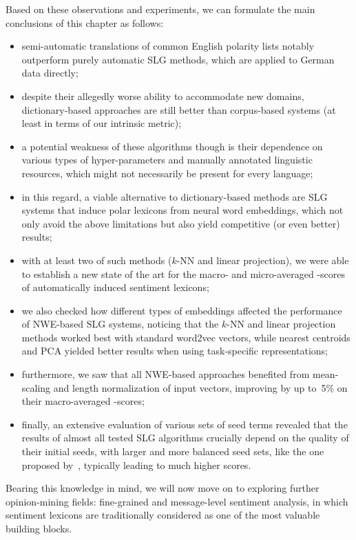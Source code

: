 Based on these observations and experiments, we can formulate the main
conclusions of this chapter as follows:
\begin{itemize}
\item semi-automatic translations of common English polarity lists
  notably outperform purely automatic SLG methods, which are applied
  to German data directly;
\item despite their allegedly worse ability to accommodate new
  domains, dictionary-based approaches are still better than
  corpus-based systems (at least in terms of our intrinsic metric);
\item a potential weakness of these algorithms though is their
  dependence on various types of hyper-parameters and manually
  annotated linguistic resources, which might not necessarily be
  present for every language;
\item in this regard, a viable alternative to dictionary-based methods
  are SLG systems that induce polar lexicons from neural word
  embeddings, which not only avoid the above limitations but also
  yield competitive (or even better) results;
\item with at least two of such methods ($k$-NN and linear
  projection), we were able to establish a new state of the art for
  the macro- and micro-averaged \F-scores of automatically induced
  sentiment lexicons;
\item we also checked how different types of embeddings affected the
  performance of NWE-based SLG systems, noticing that the $k$-NN and
  linear projection methods worked best with standard word2vec
  vectors, while nearest centroids and PCA yielded better results when
  using task-specific representations;
\item furthermore, we saw that all NWE-based approaches benefited from
  mean-scaling and length normalization of input vectors, improving by
  up to~5\% on their macro-averaged \F-scores;
\item finally, an extensive evaluation of various sets of seed terms
  revealed that the results of almost all tested SLG algorithms
  crucially depend on the quality of their initial seeds, with larger
  and more balanced seed sets, \eg{} like the one proposed
  by~\citet{Kim:04}, typically leading to much higher scores.
\end{itemize}

Bearing this knowledge in mind, we will now move on to exploring
further opinion-mining fields: fine-grained and message-level
sentiment analysis, in which sentiment lexicons are traditionally
considered as one of the most valuable building blocks.
